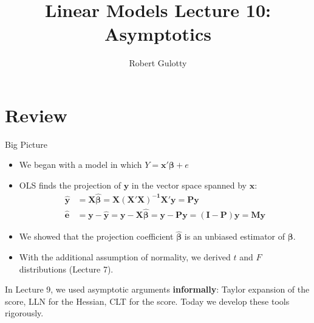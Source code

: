 \documentclass[handout, aspectratio=169]{beamer}
\title[PLSC 30700]{Linear Models Lecture 10: Asymptotics}
\author{Robert Gulotty}
\institute[Chicago]{University of Chicago}
\numberwithin{equation}{section}
\begin{document}
\begin{frame}
\maketitle
\end{frame}

\section{Review}
\setcounter{subsection}{1}

\begin{frame}{Big Picture}
\begin{itemize}
\item We began with a model in which $Y=\bm{x}'\bm{\beta}+e$
\item OLS finds the projection of $\bm{y}$ in the vector space spanned by $\bm{x}$:
\begin{align*}
\bm{\hat{y}}&=\bm{X\hat{\beta}}=\bm{X(X'X)^{-1}X'y}=\bm{Py}\\
\bm{\hat{e}}&=\bm{y}-\bm{\hat{y}}=\bm{y}-\bm{X\hat{\beta}}=\bm{y}-\bm{Py}=(\bm{I}-\bm{P})\bm{y}=\bm{My}
\end{align*}
\item We showed that the projection coefficient $\bm{\hat{\beta}}$ is an unbiased estimator of $\bm{\beta}$.
\item With the additional assumption of normality, we derived $t$ and $F$ distributions (Lecture 7).
\end{itemize}

\pause

\begin{tcolorbox}[colback=blue!5, colframe=blue!50]
In Lecture 9, we used asymptotic arguments \textbf{informally}: Taylor expansion of the score, LLN for the Hessian, CLT for the score. Today we develop these tools rigorously.
\end{tcolorbox}
\end{frame}

\end{document}
